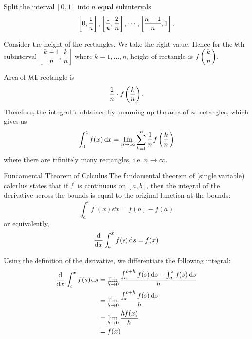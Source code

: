 Split the interval $[0,1]$ into $n$ equal subintervals 
\[\left[0, \frac{1}{n}\right], \left[\frac{1}{n}, \frac{2}{n}\right], \cdots, \left[\frac{n-1}{n}, 1\right].\]

Consider the height of the rectangles. We take the right value. Hence for the $k$th subinterval $\left[\dfrac{k-1}{n}, \dfrac{k}{n}\right]$ where $k=1,\dots,n$, height of rectangle is $f\left(\dfrac{k}{n}\right)$.

Area of $k$th rectangle is \[ \frac{1}{n} \cdot f\left(\frac{k}{n}\right).\]
Therefore, the integral is obtained by summing up the area of $n$ rectangles, which gives us
\begin{equation} \int_{0}^{1} f(x) \dd{x} = \lim_{n \to \infty} \sum_{k=1}^{n} \frac{1}{n} f\left(\frac{k}{n}\right) \end{equation}
where there are infinitely many rectangles, i.e. $n \to \infty$.

\begin{thrm}{Fundamental Theorem of Calculus}{}
The fundamental theorem of (single variable) calculus states that if $f^\prime$ is continuous on $[a,b]$, then the integral of the derivative across the bounds is equal to the original function at the bounds:
\begin{equation}
\int_a^b f^\prime(x) \dd{x} = f(b)-f(a)
\end{equation}
or equivalently,
\begin{equation}
\dv{x} \int_{a}^{x} f(s) \dd{s} = f(x)
\end{equation}
\end{thrm}


Using the definition of the derivative, we differentiate the following integral:
\begin{align*}
\dv{x} \int_{a}^{x} f(s) \dd{s} &= \lim_{h \to 0} \frac{\int_{a}^{x+h} f(s) \dd{s} - \int_{a}^{x} f(s) \dd{s}}{h}\\
&= \lim_{h \to 0} \frac{\int_{x}^{x+h} f(s) \dd{s}}{h}\\
&= \lim_{h \to 0} \frac{h f(x)}{h}\\
&= f(x)
\end{align*}

